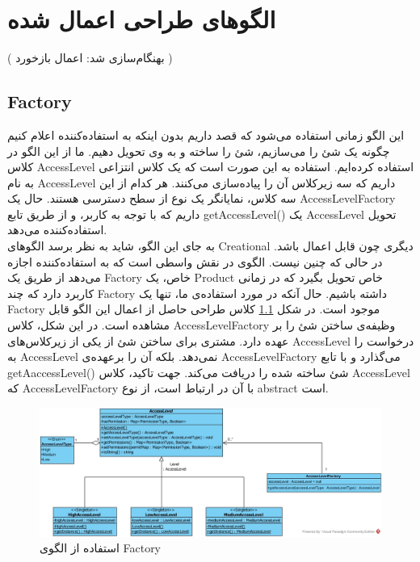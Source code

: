 

\chapter{الگوهای طراحی اعمال شده}
({\color{red} بهنگام‌سازی شد: اعمال بازخورد })

\newpage
\section{Factory}
این الگو زمانی استفاده می‌شود که قصد داریم بدون اینکه به استفاده‌کننده اعلام کنیم چگونه یک شئ را می‌سازیم، شئ را ساخته و به وی تحویل دهیم. ما از این الگو در کلاس AccessLevel استفاده کرده‌ایم. استفاده به این صورت است که یک کلاس انتزاعی
 به نام AccessLevel داریم که سه زیرکلاس آن را پیاده‌سازی می‌کنند. هر کدام از این سه کلاس، نمایانگر یک نوع از سطح دسترسی هستند. حال یک AccessLevelFactory داریم که با توجه به کاربر،‌ و از طریق تابع getAccessLevel() یک AccessLevel تحویل استفاده‌کننده می‌دهد.\\
 به جای این الگو، شاید به نظر برسد الگوهای Creational دیگری چون 
  قابل اعمال باشد. در حالی که چنین نیست. الگوی
 در نقش واسطی است که به استفاده‌کننده اجازه می‌دهد از طریق یک Factory خاص، یک Product خاص تحویل بگیرد که در زمانی کاربرد دارد که چند Factory داشته باشیم. حال آنکه در مورد استفاده‌ی ما، تنها یک Factory موجود است.
در شکل 
\ref{f200}
کلاس طراحی حاصل از اعمال این الگو قابل مشاهده است. در این شکل، کلاس  AccessLevelFactory
وظیفه‌ی ساختن شئ را بر عهده دارد. مشتری  برای ساختن شئ از  یکی از زیرکلاس‌های AccessLevel درخواست را به AccessLevel نمی‌دهد. بلکه آن را برعهده‌ی AccessLevelFactory می‌گذارد و با تابع getAaccessLevel() شئ ساخته شده را دریافت می‌کند. جهت تاکید، کلاس AccessLevel  که AccessLevelFactory
با آن در  ارتباط است، از نوع abstract است. 

\begin{figure}[H]
	\centering
	\includegraphics[scale=0.5]{img/pattern/factory}
	\caption{استفاده از الگوی Factory}
	\label{f200}
\end{figure}

